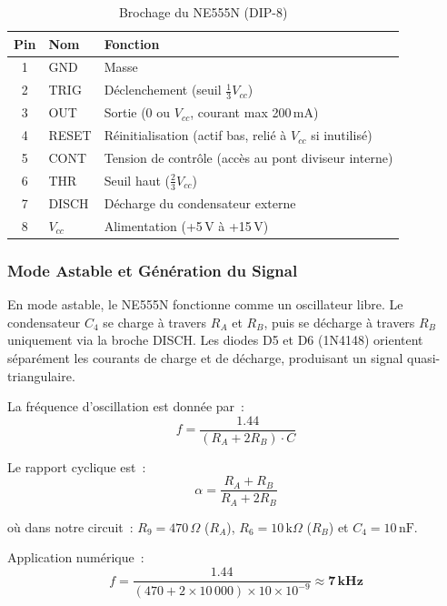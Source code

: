 \documentclass[a4paper,12pt,openany]{book}
\begin{document}
	\begin{table}[H]
		\centering
		\caption{Brochage du NE555N (DIP-8)}
		\begin{tabular}{|c|l|l|}
			\hline
			\textbf{Pin} & \textbf{Nom} & \textbf{Fonction} \\
			\hline
			1 & GND   & Masse \\
			2 & TRIG  & D\'eclenchement (seuil $\frac{1}{3}V_{cc}$) \\
			3 & OUT   & Sortie (0 ou $V_{cc}$, courant max 200\,mA) \\
			4 & RESET & R\'einitialisation (actif bas, reli\'e \`a $V_{cc}$ si inutilis\'e) \\
			5 & CONT  & Tension de contr\^ole (acc\`es au pont diviseur interne) \\
			6 & THR   & Seuil haut ($\frac{2}{3}V_{cc}$) \\
			7 & DISCH & D\'echarge du condensateur externe \\
			8 & $V_{cc}$ & Alimentation (+5\,V \`a +15\,V) \\
			\hline
		\end{tabular}
		\label{tab:ne555_pins}
	\end{table}
	
	\subsubsection{Mode Astable et G\'en\'eration du Signal}
	
	En mode astable, le NE555N fonctionne comme un oscillateur libre.
	Le condensateur $C_4$ se charge \`a travers $R_A$ et $R_B$, puis se
	d\'echarge \`a travers $R_B$ uniquement via la broche DISCH. Les
	diodes D5 et D6 (1N4148) orientent s\'epar\'ement les courants de
	charge et de d\'echarge, produisant un signal quasi-triangulaire.
	
	La fr\'equence d'oscillation est donn\'ee par~:
	\begin{equation}
		f = \frac{1.44}{(R_A + 2R_B) \cdot C}
	\end{equation}
	
	Le rapport cyclique est~:
	\begin{equation}
		\alpha = \frac{R_A + R_B}{R_A + 2R_B}
	\end{equation}
	
	o\`u dans notre circuit~: $R_9 = 470\,\Omega$ ($R_A$),
	$R_6 = 10\,\text{k}\Omega$ ($R_B$) et $C_4 = 10\,\text{nF}$.
	
	\noindent Application num\'erique~:
	\begin{equation}
		f = \frac{1.44}{(470 + 2 \times 10\,000) \times 10 \times 10^{-9}}
		\approx \mathbf{7\,kHz}
	\end{equation}
	
\end{document}
